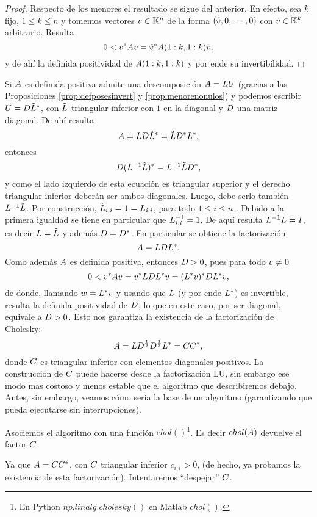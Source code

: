 \begin{tcolorbox}
\begin{proof}
 Respecto de los menores el resultado se sigue del anterior. En efecto, sea $k$ fijo, $1\le k\le n$ y tomemos
 vectores $\vb\in \K^n$ de la forma
 $(\tilde \vb,0,\cdots,0)$ con $\tilde \vb \in \K^k$ arbitrario. Resulta
 $$
 0<\vb^*\Ab\vb=\tilde\vb^*\Ab(1:k,1:k)\tilde \vb,
 $$
 y de ahí la definida positividad de $\Ab(1:k,1:k)$ y por ende su invertibilidad.
\end{proof}


Si $\Ab$ es definida positiva  admite una descomposición $\Ab=\Lb\Ub$ (gracias a las Proposiciones \ref{prop:defposesinvert} y \ref{prop:menorenonulos}) y
podemos escribir  $\Ub=\Db\tilde \Lb^*$, con $\tilde \Lb$ triangular inferior con $1$ en la diagonal y $\Db$ una matriz diagonal. De ahí resulta
$$
\Ab=\Lb\Db\tilde{ \Lb}^*=\tilde \Lb\Db^*\Lb^*,
$$
entonces
$$
\Db(\Lb^{-1}\tilde{ \Lb})^* = \Lb^{-1}\tilde \Lb\Db^*,
$$
y como el lado izquierdo de esta ecuación es triangular superior y el derecho triangular inferior deberán ser ambos diagonales. Luego, debe serlo también $\Lb^{-1}\tilde \Lb$. Por  construcción, $\tilde\Lb_{i,i}=1=\Lb_{i,i}$, para todo $1\le i\le n$ . Debido a la primera igualdad se tiene en particular que
$\Lb^{-1}_{i,i}=1$. De aquí resulta
$\Lb^{-1}\tilde \Lb=\Ib$, es decir
$\Lb=\tilde \Lb$ y además $\Db=\Db^*$.
En particular se obtiene la factorización
$$
\Ab=\Lb\Db\Lb^*.
$$
Como además $\Ab$ es definida positiva, entonces $\Db>0$, pues para todo $\vb\neq 0$
$$
0<\vb^*\Ab\vb=\vb^*\Lb\Db\Lb^*\vb=
(\Lb^*\vb)^*\Db\Lb^*\vb,
$$
de donde, llamando $\wb=\Lb^*\vb$ y usando que $\Lb$ (y por ende $\Lb^*$) es invertible, resulta la definida positividad de $\Db$, lo que en este caso, por ser diagonal, equivale a $\Db>0$. Esto nos garantiza la existencia de la factorización de Cholesky:
$$
\Ab=\Lb\Db^{\frac{1}{2}}\Db^{\frac{1}{2}}\Lb^*=\Cb\Cb^*,
$$
donde $\Cb$ es triangular inferior con elementos diagonales positivos. La construcción de $\Cb$ puede hacerse desde la factorización LU, sin embargo
ese modo mas costoso y menos estable que el algoritmo que describiremos debajo. Antes, sin embargo, veamos cómo sería la base de un algoritmo (garantizando que pueda ejecutarse sin interrupciones).

Asociemos el algoritmo con una función $chol()$\footnote{En Python $np.linalg.cholesky()$ en Matlab $chol()$.}. Es decir $chol(\Ab)$ devuelve el factor $\Cb$.

Ya que $\Ab=\Cb\Cb^*$, con $\Cb$ triangular inferior $c_{i,i}>0$, (de hecho, ya probamos la existencia de esta factorización). Intentaremos ``despejar'' $\Cb$.


\end{tcolorbox}
